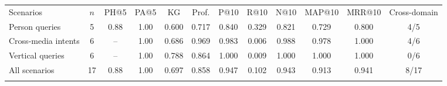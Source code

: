 \setlength{\tabcolsep}{3pt}
\begin{tabular*}{\hsize}{@{\extracolsep{\fill}}lccccccccccc@{}}
\toprule
Scenarios & $n$ & PH@5 & PA@5 & KG & Prof. & P@10 & R@10 & N@10 & MAP@10 & MRR@10 & Cross-domain \\
\colrule
Person queries & 5 & 0.88 & 1.00 & 0.600 & 0.717 & 0.840 & 0.329 & 0.821 & 0.729 & 0.800 & 4/5 \\
Cross-media intents & 6 & -- & 1.00 & 0.686 & 0.969 & 0.983 & 0.006 & 0.988 & 0.978 & 1.000 & 4/6 \\
Vertical queries & 6 & -- & 1.00 & 0.788 & 0.864 & 1.000 & 0.009 & 1.000 & 1.000 & 1.000 & 0/6 \\
\colrule
All scenarios & 17 & 0.88 & 1.00 & 0.697 & 0.858 & 0.947 & 0.102 & 0.943 & 0.913 & 0.941 & 8/17 \\
\botrule
\end{tabular*}
